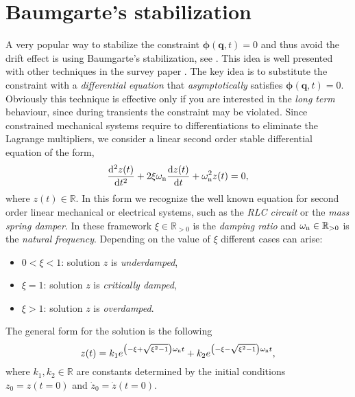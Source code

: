 %
%

\section{Baumgarte's stabilization}

A very popular way to stabilize the constraint $\bm{\phi}(\bm{q},t)=0$
and thus avoid the drift effect is using Baumgarte's stabilization,
see \cite{baumgarte1972stabilization}.
This idea is well presented with other techniques in the survey paper
\cite{ascher1995stabilization}.
The key idea is to substitute the constraint with a \emph{differential equation}
that \emph{asymptotically} satisfies $\bm{\phi}(\bm{q},t)=0$.
Obviously this technique is effective only if you are interested in
the \emph{long term} behaviour, since during transients the constraint
may be violated. Since constrained mechanical systems require to
differentiations to eliminate the Lagrange multipliers,
we consider a linear second order stable differential equation of the form,
\begin{equation}
	\label{eq:secondordersystem}
	\frac{\mathop{}\!\mathrm{d}^2 z(t)}{\mathop{}\!\mathrm{d} t^2} +
	2\xi\omega_{\textnormal{n}}\frac{\mathop{}\!\mathrm{d} z(t)}{\mathop{}\!\mathrm{d} t}
	+ \omega_{\textnormal{n}}^2z(t) = 0,
\end{equation}
where $z(t)\in\mathbb{R}$. In this form we recognize the well known
equation for second order linear mechanical or electrical systems,
such as the \emph{RLC circuit} or the \emph{mass spring damper}.
In these framework $\xi\in\mathbb{R}_{>0}$ is the \emph{damping ratio}
and $\omega_{\textnormal{n}}\in\mathbb{R}_{>0}$ is the \emph{natural frequency}.
Depending on the value of $\xi$ different cases can arise:
\begin{itemize}
	\item $0<\xi<1$: solution $z$ is \emph{underdamped},
	\item $\xi=1$: solution $z$ is \emph{critically damped},
	\item $\xi>1$: solution $z$ is \emph{overdamped}.
\end{itemize}
The general form for the solution is the following
\begin{equation*}
	z(t) = k_{1}e^{\left(-\xi+\sqrt{\xi^2-1}\right)\omega_{\textnormal{n}}t}
	+ k_{2}e^{\left(-\xi-\sqrt{\xi^2-1}\right)\omega_{\textnormal{n}}t}, 
\end{equation*}
where $k_{1},k_{2}\in\mathbb{R}$ are constants determined by the initial
conditions $z_{0} = z(t=0)$ and $\dot{z}_{0} = \dot{z}(t=0)$.
